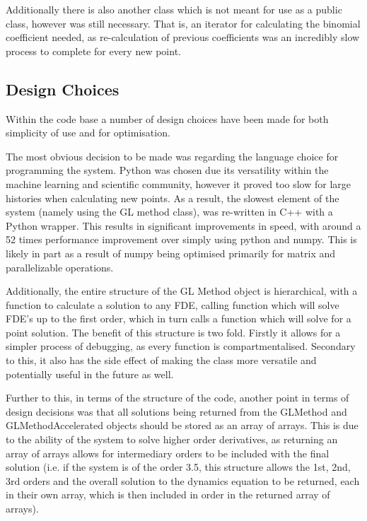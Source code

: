 Additionally there is also another class which is not meant for use as a public class, however was still necessary. That is, an iterator for calculating the binomial coefficient needed, as re-calculation of previous coefficients was an incredibly slow process to complete for every new point.

\subsection{Design Choices}

Within the code base a number of design choices have been made for both simplicity of use and for optimisation.

The most obvious decision to be made was regarding the language choice for programming the system. Python was chosen due its versatility within the machine learning and scientific community, however it proved too slow for large histories when calculating new points. As a result, the slowest element of the system (namely using the GL method class), was re-written in C++ with a Python wrapper. This results in significant improvements in speed, with around a 52 times performance improvement over simply using python and numpy. This is likely in part as a result of numpy being optimised primarily for matrix and parallelizable operations.

Additionally, the entire structure of the GL Method object is hierarchical, with a function to calculate a solution to any FDE, calling function which will solve FDE's up to the first order, which in turn calls a function which will solve for a point solution. The benefit of this structure is two fold. Firstly it allows for a simpler process of debugging, as every function is compartmentalised. Secondary to this, it also has the side effect of making the class more versatile and potentially useful in the future as well.

Further to this, in terms of the structure of the code, another point in terms of design decisions was that all solutions being returned from the GLMethod and GLMethodAccelerated objects should be stored as an array of arrays. This is due to the ability of the system to solve higher order derivatives, as returning an array of arrays allows for intermediary orders to be included with the final solution (i.e. if the system is of the order 3.5, this structure allows the 1st, 2nd, 3rd orders and the overall solution to the dynamics equation to be returned, each in their own array, which is then included in order in the returned array of arrays).

